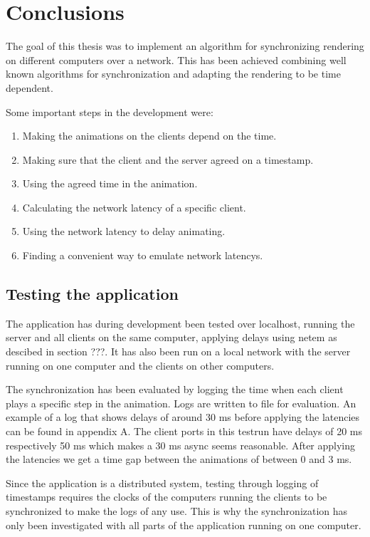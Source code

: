 \chapter{Conclusions}
The goal of this thesis was to implement an algorithm for synchronizing rendering on different computers over a network. This has been achieved combining well known algorithms for synchronization and adapting the rendering to be time dependent. 

Some important steps in the development were:
\begin{enumerate}
  \item Making the animations on the clients depend on the time. 
  \item Making sure that the client and the server agreed on a timestamp.
  \item Using the agreed time in the animation.
  \item Calculating the network latency of a specific client.
  \item Using the network latency to delay animating. 
  \item Finding a convenient way to emulate network latencys.
\end{enumerate}

\section {Testing the application}
The application has during development been tested over localhost, running the server and all clients on the same computer, applying delays using netem as descibed in section ???. It has also been run on a local network with the server running on one computer and the clients on other computers. 

The synchronization has been evaluated by logging the time when each client plays a specific step in the animation. Logs are written to file for evaluation. An example of a log that shows delays of around 30 ms before applying the latencies can be found in appendix A. The client ports in this testrun have delays of 20 ms respectively 50 ms which makes a 30 ms async seems reasonable. After applying the latencies we get a time gap between the animations of between 0 and 3 ms. 

Since the application is a distributed system, testing through logging of timestamps requires the clocks of the computers running the clients to be synchronized to make the logs of any use. This is why the synchronization has only been investigated with all parts of the application running on one computer. 


